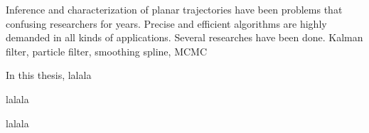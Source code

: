 Inference and characterization of planar trajectories have been problems that confusing researchers for years. Precise and efficient algorithms are highly demanded in all kinds of applications. Several researches have been done. Kalman filter, particle filter, smoothing spline, MCMC


In this thesis, lalala

lalala

lalala